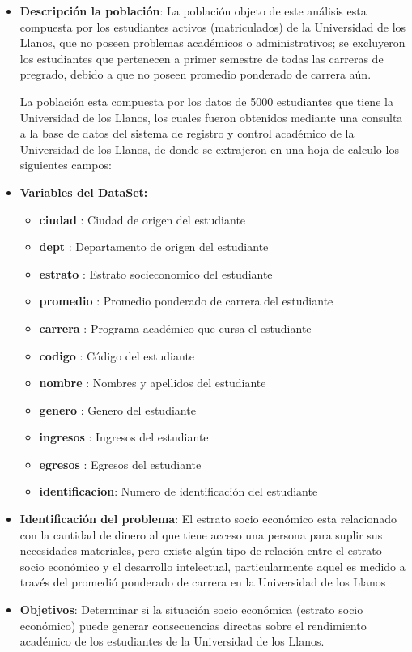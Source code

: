   \begin{itemize}
   \item \textbf{Descripción la población}: La población objeto de este análisis esta compuesta por los estudiantes activos (matriculados) de la Universidad de los Llanos, que no poseen problemas académicos o administrativos; se excluyeron los estudiantes que pertenecen a primer semestre de todas las carreras de pregrado, debido a que no poseen promedio ponderado de carrera aún. 
   \bigskip
 
   La población esta compuesta por los datos de 5000 estudiantes que tiene la Universidad de los Llanos, los cuales fueron obtenidos mediante una consulta a la base de datos del sistema de registro y control académico de la Universidad de los Llanos, de donde se extrajeron en una hoja de calculo los siguientes campos:
   
   \item \textbf{Variables del DataSet:}\\
	    
	   \begin{itemize}
		   \item \textbf{ciudad}   : Ciudad de origen del estudiante
		   \item \textbf{dept} 	   : Departamento de origen del estudiante
		   \item \textbf{estrato}  : Estrato socieconomico del estudiante
		   \item \textbf{promedio} : Promedio ponderado de carrera del estudiante
		   \item \textbf{carrera}  : Programa académico que cursa el estudiante
		   \item \textbf{codigo}   : Código del estudiante
		   \item \textbf{nombre}   : Nombres y apellidos del estudiante
		   \item \textbf{genero}   : Genero del estudiante
		   \item \textbf{ingresos} : Ingresos del estudiante
		   \item \textbf{egresos}  : Egresos del estudiante
		   \item \textbf{identificacion}: Numero de identificación del estudiante
		\end{itemize}
	   
	   \item \textbf{Identificación del problema}: El estrato socio económico esta relacionado con la cantidad de dinero al que tiene acceso una persona para suplir sus necesidades materiales, pero existe algún tipo de relación entre el estrato socio económico y el desarrollo intelectual, particularmente aquel es medido a través del promedió ponderado de carrera en la Universidad de los Llanos\\ 
	    
	   \item \textbf{Objetivos}: Determinar si la situación socio económica (estrato socio económico) puede generar consecuencias directas sobre el rendimiento académico de los estudiantes de la Universidad de los Llanos.
   
  \end{itemize}
